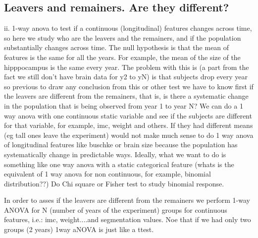 \documentclass[11pt]{article}
\theoremstyle{definition}
\theoremstyle{remark}
\begin{document}
\subsection{Leavers and remainers. Are they different?}
\label{sse:res}
ii. 1-way anova to test if a continuous (longitudinal) features changes across time, so here we study who are the leavers and the remainers, and if the population substantially changes across time. The null hypothesis is that the mean of features is the same for all the years. For example, the mean of the size of the hipppocampus is the same every year. The problem with this is (a part from the fact we still don't have brain data for y2 to yN) is that subjects drop every year so previous to draw any conclusion from this or other test we have to know first if the leavers are different from the remainers, that is, is there a systematic change in the population that is being observed from year 1 to year N?
We can do a 1 way anova with one continuous static variable and see if the subjects are different for that variable, for example, imc, weight and others. If they had different means (eg tall ones leave the experiment) would not make much sense to do 1 way anova of longitudinal features like buschke or brain size because the population has systematically change in predictable ways.
Ideally, what we want to do is something like one way anova with a static categorical feature (whats is the equivalent of 1 way anova for non continuous, for example, binomial distribution??) Do Chi square or Fisher test to study binomial response.


In order to asses if the leavers are different from the remainers we perform 1-way ANOVA for N (number of years of the experiment) groups for continuous features, i.e.: imc, weight....and segmentation values.
Noe that if we had only two groups (2 years) 1way aNOVA is just like a ttest.

\paragraph*{}
\end{document}
